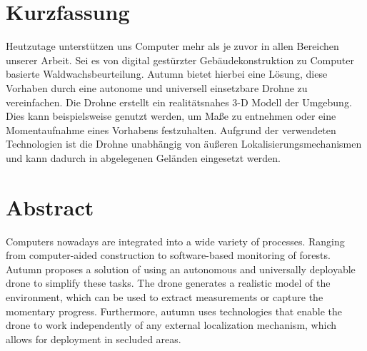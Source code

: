 \chapter{Kurzfassung}

\vspace{10mm}

Heutzutage unterstützen uns Computer mehr als je zuvor in allen Bereichen unserer Arbeit. Sei es von digital gestürzter Gebäudekonstruktion zu Computer basierte Waldwachsbeurteilung. Autumn bietet hierbei eine Lösung, diese Vorhaben durch eine autonome und universell einsetzbare Drohne zu vereinfachen. Die Drohne erstellt ein realitätsnahes 3-D Modell der Umgebung. Dies kann beispielsweise genutzt werden, um Maße zu entnehmen oder eine Momentaufnahme eines Vorhabens festzuhalten. Aufgrund der verwendeten Technologien ist die Drohne unabhängig von äußeren Lokalisierungsmechanismen und kann dadurch in abgelegenen Geländen eingesetzt werden.

\chapter{Abstract}

\vspace{10mm}

Computers nowadays are integrated into a wide variety of processes. Ranging from computer-aided construction to software-based monitoring of forests. Autumn proposes a solution of using an autonomous and universally deployable drone to simplify these tasks. The drone generates a realistic model of the environment, which can be used to extract measurements or capture the momentary progress. Furthermore, autumn uses technologies that enable the drone to work independently of any external localization mechanism, which allows for deployment in secluded areas.